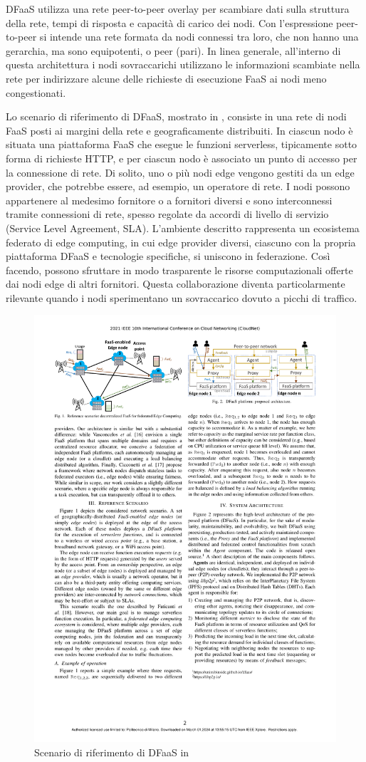 DFaaS utilizza una rete peer-to-peer overlay per scambiare dati sulla struttura della rete, tempi di risposta e capacità di carico dei nodi. Con l’espressione peer-to-peer si intende una rete formata da nodi connessi tra loro, che non hanno una gerarchia, ma sono equipotenti, o peer (pari). In linea generale, all'interno di questa architettura i nodi sovraccarichi utilizzano le informazioni scambiate nella rete per indirizzare alcune delle richieste di esecuzione FaaS ai nodi meno congestionati.

Lo scenario di riferimento di DFaaS, mostrato in , consiste in una rete di nodi FaaS posti ai margini della rete e geograficamente distribuiti. In ciascun nodo è situata una piattaforma FaaS che esegue le funzioni serverless, tipicamente sotto forma di richieste HTTP, e per ciascun nodo è associato un punto di accesso per la connessione di rete. Di solito, uno o più nodi edge vengono gestiti da un edge provider, che potrebbe essere, ad esempio, un operatore di rete. I nodi possono appartenere al medesimo fornitore o a fornitori diversi e sono interconnessi tramite connessioni di rete, spesso regolate da accordi di livello di servizio (Service Level Agreement, SLA). L’ambiente descritto rappresenta un ecosistema federato di edge computing, in cui edge provider diversi, ciascuno con la propria piattaforma DFaaS e tecnologie specifiche, si uniscono in federazione. Così facendo, possono sfruttare in modo trasparente le risorse computazionali offerte dai nodi edge di altri fornitori. Questa collaborazione diventa particolarmente rilevante quando i nodi sperimentano un sovraccarico dovuto a picchi di traffico. 

\begin{figure}
    \centering
    \includegraphics[width=.7\linewidth]{assets/2/dfaas_scenario.pdf}
    \caption[Scenario di riferimento di DFaaS]{Scenario di riferimento di DFaaS in \cite{Ciavotta2021}}
    \label{fig:2_dfaas_scenario}
\end{figure}

